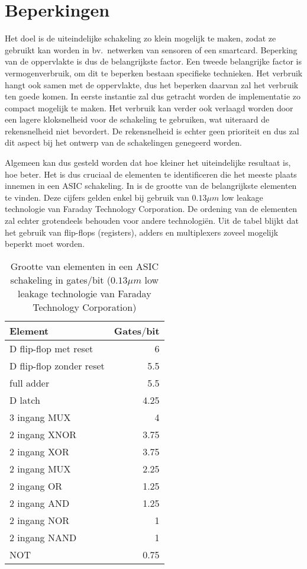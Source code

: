 \section{Beperkingen\label{sectie-implementatie-beperkingen}}

Het doel is de uiteindelijke schakeling zo klein mogelijk te maken, zodat ze gebruikt kan worden in bv.\ netwerken van sensoren of een smartcard. Beperking van de oppervlakte is dus de belangrijkste factor. Een tweede belangrijke factor is vermogenverbruik, om dit te beperken bestaan specifieke technieken. Het verbruik hangt ook samen met de oppervlakte, dus het beperken daarvan zal het verbruik ten goede komen. In eerste instantie zal dus getracht worden de implementatie zo compact mogelijk te maken. Het verbruik kan verder ook verlaagd worden door een lagere kloksnelheid voor de schakeling te gebruiken, wat uiteraard de rekensnelheid niet bevordert. De rekensnelheid is echter geen prioriteit en dus zal dit aspect bij het ontwerp van de schakelingen genegeerd worden.

Algemeen kan dus gesteld worden dat hoe kleiner het uiteindelijke resultaat is, hoe beter. Het is dus cruciaal de elementen te identificeren die het meeste plaats innemen in een ASIC schakeling. In  is de grootte van de belangrijkste elementen te vinden. Deze cijfers gelden enkel bij gebruik van $0.13 \mu m$ low leakage technologie van Faraday Technology Corporation. De ordening van de elementen zal echter grotendeels behouden voor andere technologi\"en. Uit de tabel blijkt dat het gebruik van flip-flops (registers), adders en multiplexers zoveel mogelijk beperkt moet worden.

\begin{table}[h]
	\caption{Grootte van elementen in een ASIC schakeling in gates$/$bit ($0.13 \mu m$ low leakage technologie van Faraday Technology Corporation) \cite{cell-databook}}
	\label{tabel-implementatie-beperkingen-elementen-gatecount}

	\centering
	\begin{tabular}{|l|r|}
		\hline
		Element			& Gates$/$bit\\
		\hline
		D flip-flop met reset	& 6\\
		D flip-flop zonder reset	& 5.5\\
		full adder		& 5.5\\
		D latch			& 4.25\\
		3 ingang MUX	& 4\\
		2 ingang XNOR	& 3.75\\
		2 ingang XOR	& 3.75\\
		2 ingang MUX	& 2.25\\
		2 ingang OR		& 1.25\\
		2 ingang AND	& 1.25\\
		2 ingang NOR	& 1\\
		2 ingang NAND	& 1\\
		NOT				& 0.75\\
		\hline		
	\end{tabular}
\end{table}

